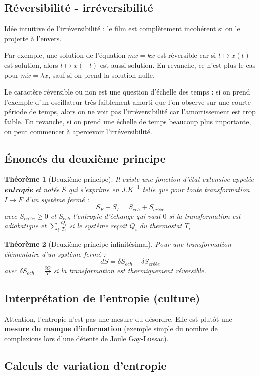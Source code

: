 \documentclass[french]{book}
\theoremstyle{plain}
\newtheorem{thm}{Théorème}
\theoremstyle{definition}
\theoremstyle{remark}
\newcommand{\inv}{^{-1}}
\begin{document}
\subsection{Réversibilité - irréversibilité}
Idée intuitive de l'irréversibilité : le film est complètement incohérent si on le projette à l'envers. \\ \par Par exemple, une solution de l'équation $m\ddot{x}=kx$ est réversible car si $t\mapsto x(t)$ est solution, alors $t\mapsto x(-t)$ est aussi solution. En revanche, ce n'est plus le cas pour $m\ddot{x}=\lambda\dot{x}$, sauf si on prend la solution nulle. \\ \par Le caractère réversible ou non est une question d'échelle des temps : si on prend l'exemple d'un oscillateur très faiblement amorti que l'on observe sur une courte période de temps, alors on ne voit pas l'irréversibilité car l'amortissement est trop faible. En revanche, si on prend une échelle de temps beaucoup plus importante, on peut commencer à apercevoir l'irréversibilité.
\subsection{Énoncés du deuxième principe}
\begin{thm}[Deuxième principe]
	Il existe une fonction d'état extensive appelée \textbf{entropie} et notée $S$ qui s'exprime en $J.K\inv$ telle que pour toute transformation $I\to F$ d'un système fermé : $$S_F-S_I=S_{ech}+S_{créée}$$ avec $S_{créée}\geqslant0$ et $S_{ech}$ l'entropie d'échange qui vaut $0$ si la transformation est adiabatique et $\displaystyle\sum_i \frac{Q_i}{T_i}$ si le système reçoit $Q_i$ du thermostat $T_i$
\end{thm}
\begin{thm}[Deuxième principe infinitésimal]
	Pour une transformation élémentaire d'un système fermé : $$dS=\delta S_{ech}+\delta S_{créée}$$ avec $\displaystyle\delta S_{ech}=\frac{\delta Q}{T}$ si la transformation est thermiquement réversible.
\end{thm}
\subsection{Interprétation de l'entropie (culture)}
Attention, l'entropie n'est pas une mesure du désordre. Elle est plutôt une \textbf{mesure du manque d'information} (exemple simple du nombre de complexions lors d'une détente de Joule Gay-Lussac).
\subsection{Calculs de variation d'entropie}
\end{document}
